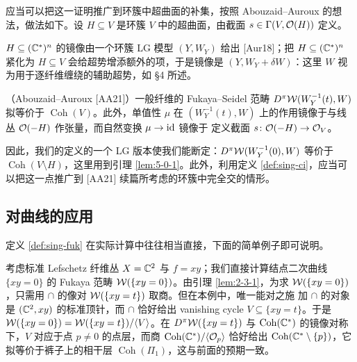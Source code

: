 应当可以把这一证明推广到环簇中超曲面的补集，按照 Abouzaid--Auroux 的想法，做法如下。设
$H\subseteq V$ 是环簇 $V$ 中的超曲面，由截面 $s\in\Gamma(V,\mathcal{O}(H))$ 定义。

$H\subseteq(\mathbb{C}^*)^n$ 的镜像由一个环簇 LG 模型 $(Y,W_Y)$ 给出 [Aur18]；把
$H\subseteq(\mathbb{C}^*)^n$ 紧化为 $H\subseteq V$ 会给超势增添额外的项，于是镜像是
$(Y,W_Y+\delta W)$：这里 $W$ 视为用于逐纤维缠绕的辅助超势，如 §4 所述。


\begin{thmstar}
（Abouzaid--Auroux [AA21]）\quad 一般纤维的 Fukaya--Seidel 范畴
$D^\pi\mathcal{W}(W_Y^{-1}(t),W)$ 拟等价于 $\operatorname{Coh}(V)$。此外，单值性 $\mu$ 在
$(W_Y^{-1}(t),W)$ 上的作用镜像于与线丛 $\mathcal{O}(-H)$ 作张量，而自然变换 $\mu\to\mathrm{id}$ 镜像于
定义截面 $s\colon\mathcal{O}(-H)\to\mathcal{O}_V$。
\end{thmstar}

因此，我们的定义的一个 LG 版本使我们能断定：$D^\pi\mathcal{W}(W_Y^{-1}(0),W)$ 等价于
$\operatorname{Coh}(V\setminus H)$，这里用到引理 \ref{lem:5-0-1}。此外，利用定义
\ref{def:sing-ci}，应当可以把这一点推广到 [AA21] 续篇所考虑的环簇中完全交的情形。


\subsection{对曲线的应用}

定义 \ref{def:sing-fuk} 在实际计算中往往相当直接，下面的简单例子即可说明。

\begin{example}\label{exam:5-2-1}
考虑标准 Lefschetz 纤维丛 $X=\mathbb{C}^2$ 与 $f=xy$；我们直接计算结点二次曲线
$\{xy=0\}$ 的 Fukaya 范畴 $\mathcal{W}(\{xy=0\})$。由引理 \ref{lem:2-3-1}，为求
$\mathcal{W}(\{xy=0\})$，只需用 $\cap$ 的像对 $\mathcal{W}(\{xy=t\})$ 取商。但在本例中，唯一能对之施
加 $\cap$ 的对象是 $(\mathbb{C}^2,xy)$ 的标准顶针，而 $\cap$ 恰好给出 vanishing cycle
$V\subseteq\{xy=t\}$。于是 $\mathcal{W}(\{xy=0\})=\mathcal{W}(\{xy=t\})/\langle V\rangle$。在
$D^\pi\mathcal{W}(\{xy=t\})$ 与 $\operatorname{Coh}(\mathbb{C}^*)$ 的镜像对称下，$V$ 对应于点
$p\neq0$ 的点层，而商 $\operatorname{Coh}(\mathbb{C}^*)/\langle\mathcal{O}_p\rangle$ 恰好给出
$\operatorname{Coh}(\mathbb{C}^*\setminus\{p\})$，它拟等价于裤子上的相干层
$\operatorname{Coh}(\Pi_1)$，这与前面的预期一致。
\end{example}

